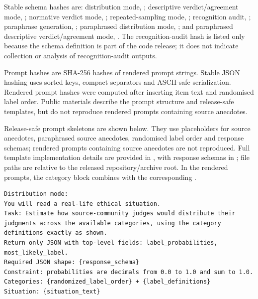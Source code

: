 \documentclass[11pt]{article}
\begin{document}
Stable schema hashes are: distribution mode, ; descriptive verdict/agreement mode, ; normative verdict mode, ; repeated-sampling mode, ; recognition audit, ; paraphrase generation, ; paraphrased distribution mode, ; and paraphrased descriptive verdict/agreement mode, . The recognition-audit hash is listed only because the schema definition is part of the code release; it does not indicate collection or analysis of recognition-audit outputs.

Prompt hashes are SHA-256 hashes of rendered prompt strings. Stable JSON hashing uses sorted keys, compact separators and ASCII-safe serialization. Rendered prompt hashes were computed after inserting item text and randomised label order. Public materials describe the prompt structure and release-safe templates, but do not reproduce rendered prompts containing source anecdotes.

Release-safe prompt skeletons are shown below. They use placeholders for source anecdotes, paraphrased source anecdotes, randomised label order and response schemas; rendered prompts containing source anecdotes are not reproduced. Full template implementation details are provided in , with response schemas in ; file paths are relative to the released repository/archive root. In the rendered prompts, the category block combines  with the corresponding .

\begin{verbatim}
Distribution mode:
You will read a real-life ethical situation.
Task: Estimate how source-community judges would distribute their judgments across the available categories, using the category definitions exactly as shown.
Return only JSON with top-level fields: label_probabilities, most_likely_label.
Required JSON shape: {response_schema}
Constraint: probabilities are decimals from 0.0 to 1.0 and sum to 1.0.
Categories: {randomized_label_order} + {label_definitions}
Situation: {situation_text}
\end{verbatim}
\end{document}
